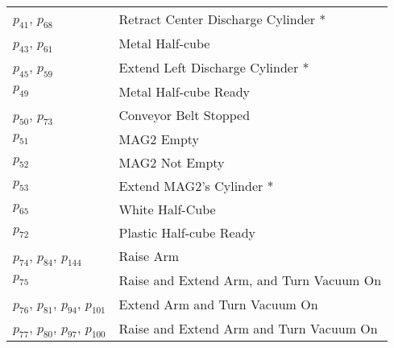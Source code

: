 \begin{longtable}{M{5cm}M{10cm}}
\hyperlink{completeNet:p41}{\hypertarget{completeTable:p41}{$p_{41}$}}, \hyperlink{completeNet:p68}{\hypertarget{completeTable:p68}{$p_{68}$}} & Retract Center Discharge Cylinder *\\
\hyperlink{completeNet:p43}{\hypertarget{completeTable:p43}{$p_{43}$}}, \hyperlink{completeNet:p61}{\hypertarget{completeTable:p61}{$p_{61}$}} & Metal Half-cube\\
\hyperlink{completeNet:p45}{\hypertarget{completeTable:p45}{$p_{45}$}}, \hyperlink{completeNet:p59}{\hypertarget{completeTable:p59}{$p_{59}$}} & Extend Left Discharge Cylinder *\\
\hyperlink{completeNet:p49}{\hypertarget{completeTable:p49}{$p_{49}$}} & Metal Half-cube Ready\\
\hyperlink{completeNet:p50}{\hypertarget{completeTable:p50}{$p_{50}$}}, \hyperlink{completeNet:p73}{\hypertarget{completeTable:p73}{$p_{73}$}} & Conveyor Belt Stopped\\
\hyperlink{completeNet:p51}{\hypertarget{completeTable:p51}{$p_{51}$}} & MAG2 Empty\\
\hyperlink{completeNet:p52}{\hypertarget{completeTable:p52}{$p_{52}$}} & MAG2 Not Empty\\
\hyperlink{completeNet:p53}{\hypertarget{completeTable:p53}{$p_{53}$}} & Extend MAG2's Cylinder *\\
\hyperlink{completeNet:p65}{\hypertarget{completeTable:p65}{$p_{65}$}} & White Half-Cube\\
\hyperlink{completeNet:p72}{\hypertarget{completeTable:p72}{$p_{72}$}} & Plastic Half-cube Ready\\
\hyperlink{completeNet:p74}{\hypertarget{completeTable:p74}{$p_{74}$}}, \hyperlink{completeNet:p84}{\hypertarget{completeTable:p84}{$p_{84}$}}, \hyperlink{completeNet:p144}{\hypertarget{completeTable:p144}{$p_{144}$}} & Raise Arm\\
\hyperlink{completeNet:p75}{\hypertarget{completeTable:p75}{$p_{75}$}} & Raise and Extend Arm, and Turn Vacuum On\\
\hyperlink{completeNet:p76}{\hypertarget{completeTable:p76}{$p_{76}$}}, \hyperlink{completeNet:p81}{\hypertarget{completeTable:p81}{$p_{81}$}}, \hyperlink{completeNet:p94}{\hypertarget{completeTable:p94}{$p_{94}$}}, \hyperlink{completeNet:p101}{\hypertarget{completeTable:p101}{$p_{101}$}} & Extend Arm and Turn Vacuum On\\
\hyperlink{completeNet:p77}{\hypertarget{completeTable:p77}{$p_{77}$}}, \hyperlink{completeNet:p80}{\hypertarget{completeTable:p80}{$p_{80}$}}, \hyperlink{completeNet:p97}{\hypertarget{completeTable:p97}{$p_{97}$}}, \hyperlink{completeNet:p100}{\hypertarget{completeTable:p100}{$p_{100}$}} & Raise and Extend Arm and Turn Vacuum On\\

\end{longtable}
